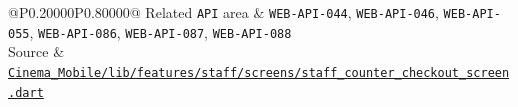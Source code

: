 \begin{longtable}{@{}P{0.20000\SRSWidth}P{0.80000\SRSWidth}@{}}
Related \texttt{API} area & \texttt{WEB-\allowbreak{}API-\allowbreak{}044}, \texttt{WEB-\allowbreak{}API-\allowbreak{}046}, \texttt{WEB-\allowbreak{}API-\allowbreak{}055}, \texttt{WEB-\allowbreak{}API-\allowbreak{}086}, \texttt{WEB-\allowbreak{}API-\allowbreak{}087}, \texttt{WEB-\allowbreak{}API-\allowbreak{}088} \\[3pt]
Source & \href{../../../Cinema\_Mobile/lib/features/staff/screens/staff\_counter\_checkout\_screen.dart}{\texttt{Cinema\_\allowbreak{}Mobile/\allowbreak{}lib/\allowbreak{}features\allowbreak{}/\allowbreak{}staff/\allowbreak{}screens/\allowbreak{}staff\_\allowbreak{}counter\_\allowbreak{}checkout\allowbreak{}\_\allowbreak{}screen.\allowbreak{}dart}} \\[3pt]
\end{longtable}
\endgroup

